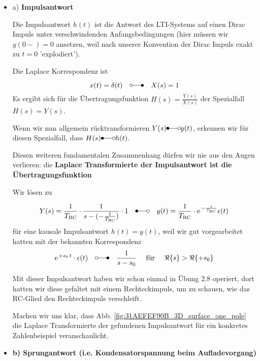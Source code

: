\documentclass[11pt,a4paper,DIV=12]{scrartcl}
\numberwithin{equation}{section}
\numberwithin{figure}{section}
\newcommand{\fig}[1]{Abb. \ref{#1}} %
\begin{document}
\begin{Loesung}


\begin{itemize}
  \item a) \textbf{Impulsantwort}

  Die Impulsantwort $h(t)$ ist die Antwort des LTI-Systems auf einen Dirac Impuls unter
  verschwindenden Anfangsbedingungen (hier müssen wir $y(0-)=0$ ansetzen, weil
  nach unserer Konvention der Dirac Impuls exakt zu $t=0$ 'explodiert').

  Die Laplace Korrespondenz ist
  \begin{equation}
  x(t)=\delta(t) \quad\laplace\quad X(s) = 1
  \end{equation}
  Es ergibt sich für die Übertragungsfunktion $H(s)=\frac{Y(s)}{X(s)}$
  der Spezialfall $H(s)=Y(s)$.

  Wenn wir nun allgemein rücktransformieren $Y(s) \Laplace y(t)$, erkennen wir
  für diesen Spezialfall, dass $H(s) \Laplace h(t)$.

  Diesen weiteren fundamentalen Zusammenhang dürfen wir nie aus den Augen verlieren:
  die \textbf{Laplace Transformierte der Impulsantwort ist die Übertragungsfunktion}

  Wir lösen zu

  \begin{align}
  Y(s) = \frac{1}{T_\mathrm{RC}}\cdot\frac{1}{s - (-\frac{1}{T_\mathrm{RC}})} \cdot 1
  \quad\Laplace\quad
  y(t) = \frac{1}{T_\mathrm{RC}} \cdot \e^{-\frac{t}{T_\mathrm{RC}}} \epsilon(t)
  \end{align}
  für eine kausale Impulsantwort $h(t)=y(t)$, weil wir gut vorgearbeitet hatten
  mit der bekannten Korrespondenz
  \begin{align}
  \e^{+s_0 \, t} \cdot \epsilon(t) \quad \laplace \quad \frac{1}{s-s_0} \quad\text{ für } \quad\Re\{s\} > \Re\{+s_0\}
  \end{align}

  Mit dieser Impulsantwort haben wir schon einmal in Übung 2.8 operiert, dort
  hatten wir diese gefaltet mit einem Rechteckimpuls, um zu schauen, wie das RC-Glied
  den Rechteckimpuls verschleift.

  Machen wir uns klar, dass \fig{fig:31AEFEF90B_3D_surface_one_pole}
  die Laplace Transformierte der gefundenen Impulsantwort für ein konkretes
  Zahlenbeispiel veranschaulicht.

  \item \textbf{b) Sprungantwort (i.e. Kondensatorspannung beim Aufladevorgang)}


\end{itemize}
\end{Loesung}
\end{document}
